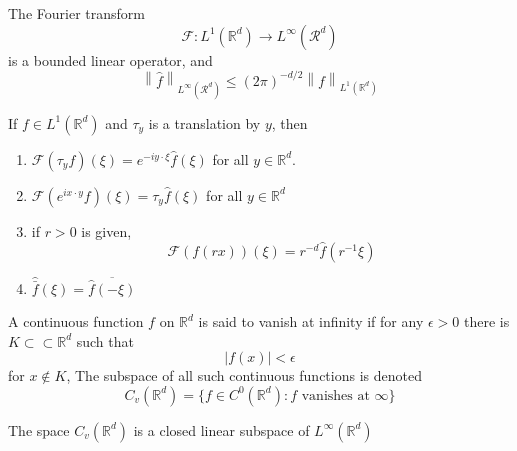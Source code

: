 \documentclass{article}
\newcommand{\norm}[1]{\left\lVert#1\right\rVert}
\begin{document}
\begin{proposition}
  The Fourier transform
  \begin{equation*}
    \mathcal{F}: L^1(\mathbb{R}^d) \to L^\infty (\mathcal{R}^d)
  \end{equation*}
  is a bounded linear operator, and 
  \begin{equation*}
    \norm{\hat{f}}_{L^\infty (\mathcal{R}^d)} \leq (2\pi)^{-d/2} \norm{f}_{L^1(\mathbb{R}^d)}
      
  \end{equation*}
\end{proposition}

\begin{proposition}
  If $f \in L^1(\mathbb{R}^d)$ and $\tau_y$ is a translation by $y$, then
  \begin{enumerate}
  \item $\mathcal{F}(\tau_yf)(\xi) = e^{-iy \cdot \xi}\hat{f}(\xi)$ for all $y \in \mathbb{R}^d$. 
\item $\mathcal{F}(e^{ix \cdot y}f)(\xi) = \tau_y \hat{f}(\xi)$ for all $y \in \mathbb{R}^d$ 
    \item if $r > 0$ is given,
      \begin{equation*}
        \mathcal{F}(f(rx))(\xi) = r^{-d}\hat{f}(r^{-1}\xi)
      \end{equation*}
  
    \item $\hat{\bar{f}}(\xi) = \overline{\hat{f}(-\xi)}$
  \end{enumerate}
\end{proposition}

\begin{principle}
  A continuous function $f$ on $\mathbb{R}^d$ is said to vanish at infinity if for any $\epsilon > 0$ there is $K \subset\subset \mathbb{R}^d$ such that
  \begin{equation*}
    |f(x)| < \epsilon
  \end{equation*}
  for $x \not\in K$, The subspace of all such continuous functions is denoted
  \begin{equation*}
    C_v(\mathbb{R}^d) = \{f \in C^0(\mathbb{R}^d): \text{$f$ vanishes at $\infty$}\}
  \end{equation*}
\end{principle}

\begin{theorem}
  The space $C_v(\mathbb{R}^d)$ is a closed linear subspace of $L^\infty(\mathbb{R}^d)$
\end{theorem}
\end{document}
